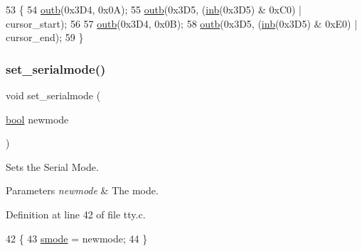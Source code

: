 \begin{DoxyCode}
53 \{
54     \hyperlink{a00158_aa37f5841c54156a4b14fc0d6f626b44f_aa37f5841c54156a4b14fc0d6f626b44f}{outb}(0x3D4, 0x0A);
55     \hyperlink{a00158_aa37f5841c54156a4b14fc0d6f626b44f_aa37f5841c54156a4b14fc0d6f626b44f}{outb}(0x3D5, (\hyperlink{a00158_a0223c8898dfec29069879dc51076e28a_a0223c8898dfec29069879dc51076e28a}{inb}(0x3D5) & 0xC0) | cursor\_start);
56  
57     \hyperlink{a00158_aa37f5841c54156a4b14fc0d6f626b44f_aa37f5841c54156a4b14fc0d6f626b44f}{outb}(0x3D4, 0x0B);
58     \hyperlink{a00158_aa37f5841c54156a4b14fc0d6f626b44f_aa37f5841c54156a4b14fc0d6f626b44f}{outb}(0x3D5, (\hyperlink{a00158_a0223c8898dfec29069879dc51076e28a_a0223c8898dfec29069879dc51076e28a}{inb}(0x3D5) & 0xE0) | cursor\_end);
59 \}
\end{DoxyCode}
\mbox{\label{a00176_ab1cdfeb7dac30904e66f81ab673ed8ca_ab1cdfeb7dac30904e66f81ab673ed8ca}} 
\subsubsection{\texorpdfstring{set\+\_\+serialmode()}{set\_serialmode()}}
{\footnotesize\ttfamily void set\+\_\+serialmode (\begin{DoxyParamCaption}\item[{\hyperlink{a00134_af6a258d8f3ee5206d682d799316314b1_af6a258d8f3ee5206d682d799316314b1}{bool}}]{newmode }\end{DoxyParamCaption})}



Sets the Serial Mode. 


\begin{DoxyParams}{Parameters}
{\em newmode} & The mode. \\
\hline
\end{DoxyParams}


Definition at line 42 of file tty.\+c.


\begin{DoxyCode}
42                                   \{
43     \hyperlink{a00173_a22b8d30f7aee33f172c1239aed53e7db_a22b8d30f7aee33f172c1239aed53e7db}{smode} = newmode;
44 \}
\end{DoxyCode}
\mbox{\label{a00176_aaf55ee008e2e63ca97eacae371646db7_aaf55ee008e2e63ca97eacae371646db7}} 
